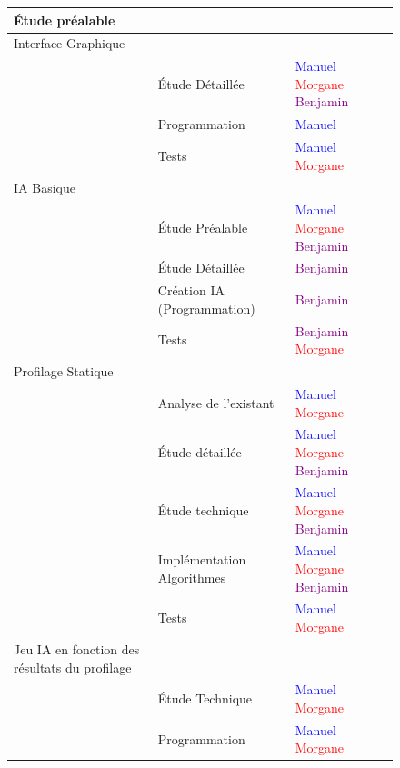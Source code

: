 \documentclass{report}
\begin{document}
		\begin{figure}[h]
			\hspace{-3cm}\begin{tabular}{|l|l|l|}
				\hline
				Étude préalable & & \\
				\hline
  				 Interface Graphique & &  \\
  				 \hline
  				 & Étude Détaillée &  \textcolor{blue}{Manuel}  \textcolor{red}{Morgane}  \textcolor{purple}{Benjamin}\\
  				 \hline
  				 & Programmation & \textcolor{blue}{Manuel}\\
  				 \hline
  				 & Tests & \textcolor{blue}{Manuel}  \textcolor{red}{Morgane}\\
  				 \hline
  				 IA Basique & & \\
  				 \hline
  				 & Étude Préalable & \textcolor{blue}{Manuel}  \textcolor{red}{Morgane}  \textcolor{purple}{Benjamin}\\
  				 \hline
  				 & Étude Détaillée & \textcolor{purple}{Benjamin}\\
  				 \hline
  				 & Création IA (Programmation) & \textcolor{purple}{Benjamin}\\
  				 \hline
  				 & Tests & \textcolor{purple}{Benjamin} \textcolor{red}{Morgane}\\
  				 \hline
  				 Profilage Statique & &\\
  				 \hline
  				 & Analyse de l'existant & \textcolor{blue}{Manuel}  \textcolor{red}{Morgane} \\
  				 \hline
  				 & Étude détaillée & \textcolor{blue}{Manuel}  \textcolor{red}{Morgane}  \textcolor{purple}{Benjamin}\\
  				 \hline
  				 & Étude technique & \textcolor{blue}{Manuel}  \textcolor{red}{Morgane}  \textcolor{purple}{Benjamin}\\
  				 \hline
  				 & Implémentation Algorithmes & \textcolor{blue}{Manuel}  \textcolor{red}{Morgane}  \textcolor{purple}{Benjamin}\\
  				 \hline
  				 & Tests & \textcolor{blue}{Manuel}  \textcolor{red}{Morgane} \\
  				 \hline
  				 Jeu IA en fonction des résultats du profilage & &\\
  				 \hline
  				 & Étude Technique & \textcolor{blue}{Manuel}  \textcolor{red}{Morgane} \\
  				 \hline
  				 & Programmation & \textcolor{blue}{Manuel}  \textcolor{red}{Morgane} \\

\end{tabular}
\end{figure}
\end{document}
